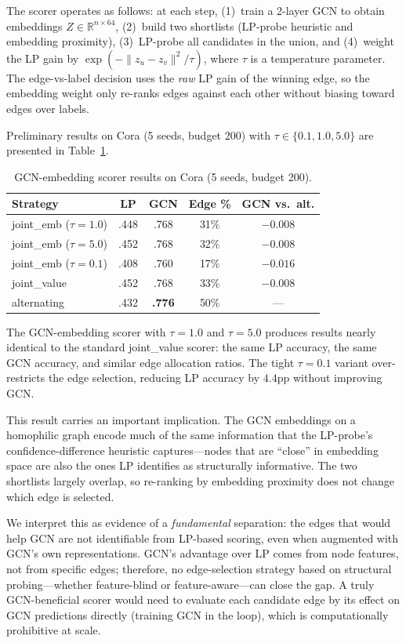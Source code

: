 \documentclass[12pt,a4paper,oneside]{report}
\begin{document}
The scorer operates as follows: at each step, (1)~train a 2-layer GCN to obtain embeddings $Z \in \mathbb{R}^{n \times 64}$, (2)~build two shortlists (LP-probe heuristic and embedding proximity), (3)~LP-probe all candidates in the union, and (4)~weight the LP gain by $\exp(-\|z_u - z_v\|^2 / \tau)$, where $\tau$ is a temperature parameter. The edge-vs-label decision uses the \emph{raw} LP gain of the winning edge, so the embedding weight only re-ranks edges against each other without biasing toward edges over labels.

Preliminary results on Cora (5 seeds, budget 200) with $\tau \in \{0.1, 1.0, 5.0\}$ are presented in Table~\ref{tab:emb_results}.

\begin{table}[htbp]
\centering
\caption{GCN-embedding scorer results on Cora (5 seeds, budget 200).}
\label{tab:emb_results}
\small
\begin{tabular}{lcccc}
\toprule
Strategy & LP & GCN & Edge \% & GCN vs.\ alt. \\
\midrule
joint\_emb ($\tau=1.0$)  & .448 & .768 & 31\% & $-0.008$ \\
joint\_emb ($\tau=5.0$)  & .452 & .768 & 32\% & $-0.008$ \\
joint\_emb ($\tau=0.1$)  & .408 & .760 & 17\% & $-0.016$ \\
joint\_value              & .452 & .768 & 33\% & $-0.008$ \\
alternating               & .432 & \textbf{.776} & 50\% & --- \\
\bottomrule
\end{tabular}
\end{table}

The GCN-embedding scorer with $\tau = 1.0$ and $\tau = 5.0$ produces results nearly identical to the standard joint\_value scorer: the same LP accuracy, the same GCN accuracy, and similar edge allocation ratios. The tight $\tau = 0.1$ variant over-restricts the edge selection, reducing LP accuracy by $4.4$pp without improving GCN.

This result carries an important implication. The GCN embeddings on a homophilic graph encode much of the same information that the LP-probe's confidence-difference heuristic captures---nodes that are ``close'' in embedding space are also the ones LP identifies as structurally informative. The two shortlists largely overlap, so re-ranking by embedding proximity does not change which edge is selected.

We interpret this as evidence of a \emph{fundamental} separation: the edges that would help GCN are not identifiable from LP-based scoring, even when augmented with GCN's own representations. GCN's advantage over LP comes from node features, not from specific edges; therefore, no edge-selection strategy based on structural probing---whether feature-blind or feature-aware---can close the gap. A truly GCN-beneficial scorer would need to evaluate each candidate edge by its effect on GCN predictions directly (training GCN in the loop), which is computationally prohibitive at scale.
\end{document}
